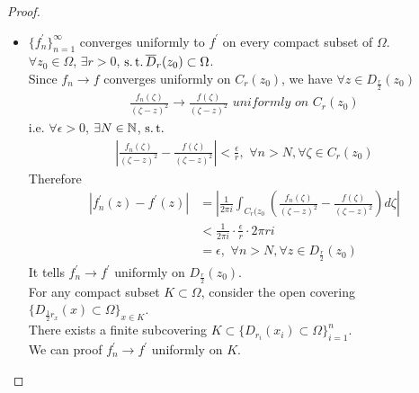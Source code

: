 \begin{thm}
\begin{proof}
\begin{enumerate}
\begin{itemize}
				\item $\{ f_{n}^{'} \}_{n = 1}^{\infty}$ converges uniformly to $f^{'}$ on every compact subset of $\Omega$. \\
				$\forall z_0 \in \Omega$, $\exists r > 0$, $\operatorname{s.t.} \overline{D}_{r}(z_0) \subset \Omega$. \\
				Since $f_n \longrightarrow f$ converges uniformly on $C_{r}(z_0)$, we have $\forall z \in D_{\frac{r}{2}}(z_0)$
				\begin{align}
					\frac{f_{n}(\zeta)}{(\zeta - z)^2} \to \frac{f(\zeta)}{(\zeta - z)^2} \,\, uniformly \,\, on \,\, C_{r}(z_0)
				\end{align}
				i.e. $\forall \epsilon > 0$, $\exists N \in \mathbb{N}$, $\operatorname{s.t.}$
				\begin{align}
					\left| \frac{f_{n}(\zeta)}{(\zeta - z)^2} - \frac{f(\zeta)}{(\zeta - z)^2} \right| < \frac{\epsilon}{r}, \,\, \forall n > N , \forall \zeta \in C_{r}(z_0)
				\end{align}
				Therefore
				\begin{align}
					\left| f_{n}^{'}(z) - f^{'}(z) \right| 
					&= \left| \frac{1}{2\pi i} \int_{C_{r}(z_0}{\left( \frac{f_{n}(\zeta)}{(\zeta - z)^2} - \frac{f(\zeta)}{(\zeta - z)^2} \right) d\zeta} \right| \\
					&< \frac{1}{2 \pi i} \cdot \frac{\epsilon}{r} \cdot 2 \pi r i \\
					&= \epsilon , \,\, \forall n > N , \forall z \in D_{\frac{r}{2}}(z_0)
				\end{align}
				It tells $f_{n}^{'} \to f^{'}$ uniformly on $D_{\frac{r}{2}}(z_0)$. \\
				For any compact subset $K \subset \Omega$, consider the open covering $\{ D_{\frac{1}{2} r_x}(x) \subset \Omega \}_{x \in K}$.\\
				There exists a finite subcovering $K \subset \{ D_{r_i}(x_i) \subset \Omega \}_{i = 1}^{n}$. \\
				We can proof $f_{n}^{'} \to f^{'}$ uniformly on $K$.
			\end{itemize}
		\end{enumerate}
	\end{proof}
\end{thm}

\newpage

